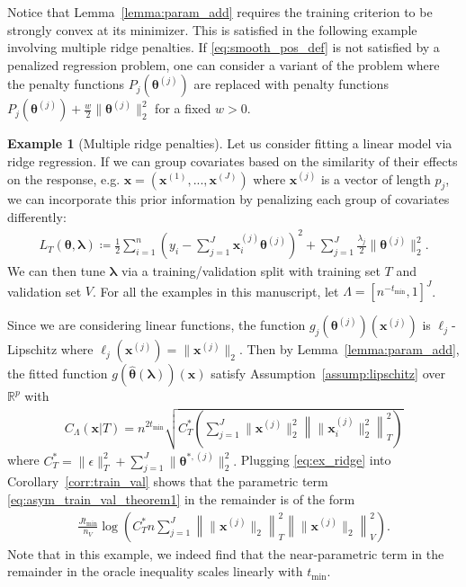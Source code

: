 \documentclass[12pt]{article} %
\theoremstyle{definition}
\newtheorem{example}{Example}
\begin{document}
\noindent Notice that Lemma~\ref{lemma:param_add} requires the training criterion to be strongly convex at its minimizer.
This is satisfied in the following example involving multiple ridge penalties.
If \eqref{eq:smooth_pos_def} is not satisfied by a penalized regression problem, one can consider a variant of the problem where the penalty functions $P_j(\boldsymbol{\theta}^{(j)})$ are replaced with penalty functions
$P_j(\boldsymbol{\theta}^{(j)}) + \frac{w}{2}\| \boldsymbol{\theta}^{(j)} \|_2^2$ for a fixed $w > 0$.
\begin{example}[Multiple ridge penalties]
	\label{ex:ridge}
	Let us consider fitting a linear model via ridge regression.
	If we can group covariates based on the similarity of their effects on the response, e.g. $\boldsymbol{x} = (\boldsymbol{x}^{(1)}, ... , \boldsymbol{x}^{(J)})$ where $\boldsymbol{x}^{(j)}$ is a vector of length $p_j$, we can incorporate this prior information by penalizing each group of covariates differently:
	\begin{align}
	L_T \left (\boldsymbol{\theta}, \boldsymbol{\lambda} \right) 
	\coloneqq 
	\frac{1}{2}
	\sum_{i=1}^n
	\left(y_i -  \sum_{j=1}^J \boldsymbol{x}_{i}^{(j)} \boldsymbol{\theta}^{(j)} \right )^2
	+ \sum_{j=1}^J \frac{\lambda_j}{2} \|\boldsymbol{\theta}^{(j)}\|_2^2.
	\end{align}
	We can then tune $\boldsymbol{\lambda}$ via a training/validation split with training set $T$ and validation set $V$.
	For all the examples in this manuscript, let $\Lambda = \left [n^{- t_{\min}}, 1 \right ]^J$.

	Since we are considering linear functions, the function $g_j(\boldsymbol{\theta}^{(j)})(\boldsymbol{x}^{(j)})$ is $\ell_j$-Lipschitz where $\ell_j(\boldsymbol{x}^{(j)}) = \|\boldsymbol{x}^{(j)}\|_2$.
	Then by Lemma~\ref{lemma:param_add}, the fitted function $g(\hat{\boldsymbol{\theta}}(\boldsymbol{\lambda}))(\boldsymbol{x})$ satisfy Assumption~\ref{assump:lipschitz} over $\mathbb{R}^p$ with
	\begin{align}
	C_\Lambda \left ( \boldsymbol{x} | T \right ) =
	n^{2t_{\min}}
	\sqrt{
		C^*_{T}
		\left(
		\sum_{j = 1}^J
		\|\boldsymbol{x}^{(j)}\|_2^2
		\left \| \|\boldsymbol{x}^{(j)}_i \|_2^2 \right \|_T^2
		\right)
	}
	\label{eq:ex_ridge}
	\end{align}
	where $
	C^*_{T} = 
	\|\epsilon\|_{T}^{2}
	+ \sum_{j=1}^J \|\boldsymbol{\theta}^{*,(j)}\|_2^2
	.$
	Plugging \eqref{eq:ex_ridge} into Corollary~\ref{corr:train_val} shows that the parametric term \eqref{eq:asym_train_val_theorem1} in the remainder is of the form
	\begin{align}
	\frac{J t_{\min}}{n_{V}}
	\log \left (
	C^*_T n
	\sum_{j = 1}^J \left \|\|\boldsymbol{x}^{(j)} \|_2 \right \|_T^2 \left \|\|\boldsymbol{x}^{(j)}\|_2 \right \|_V^2
	\right ).
	\end{align}
	Note that in this example, we indeed find that the near-parametric term in the remainder in the oracle inequality scales linearly with $t_{\min}$.
\end{example}
\end{document}
